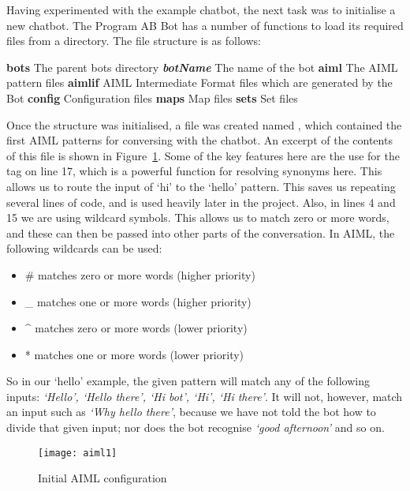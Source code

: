 Having experimented with the example chatbot, the next task was to initialise a new chatbot. The Program AB Bot has a number of functions to load its required files from a directory. The file structure is as follows:

\begin{outline}
	\1 \textbf{bots} The parent bots directory
		\2 \textbf{\emph{botName}} The name of the bot
			\3 \textbf{aiml} The AIML pattern files 
			\3 \textbf{aimlif} AIML Intermediate Format files which are generated by the Bot
			\3 \textbf{config} Configuration files
			\3 \textbf{maps} Map files
			\3 \textbf{sets} Set files
\end{outline}
	
Once the structure was initialised, a file was created named , which contained the first AIML patterns for conversing with the chatbot. An excerpt of the contents of this file is shown in Figure~\ref{fig:aiml1}. Some of the key features here are the use for the  tag on line 17, which is a powerful function for resolving synonyms here. This allows us to route the input of `hi' to the `hello' pattern. This saves us repeating several lines of code, and is used heavily later in the project. Also, in lines 4 and 15 we are using wildcard symbols. This allows us to match zero or more words, and these can then be passed into other parts of the conversation. In AIML, the following wildcards can be used:

\begin{itemize}
	\item \# matches zero or more words (higher priority)
	\item \_ matches one or more words (higher priority)
	\item \^{} matches zero or more words (lower priority)
	\item * matches one or more words (lower priority)
\end{itemize}

So in our `hello' example, the given pattern will match any of the following inputs: {\it{`Hello', `Hello there', `Hi bot', `Hi', `Hi there'}}. It will not, however, match an input such as {\it{`Why hello there'}}, because we have not told the bot how to divide that given input; nor does the bot recognise {\it{`good afternoon'}} and so on.

\begin{figure}[h]
	\centering
	\texttt{[image: aiml1]}
	\caption{Initial AIML configuration}
	\label{fig:aiml1}
\end{figure}

